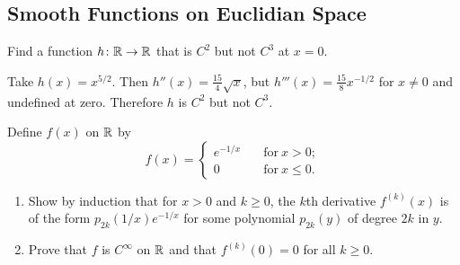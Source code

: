 \subsection{Smooth Functions on Euclidian Space}
\begin{prob}
Find a function $h \colon \mathbb{R} \to \mathbb{R}$ that is $C^2$ but not $C^3$ at $x=0$.    
\end{prob}
\begin{solution}
    Take $h(x)=x^{5/2}$. Then $h''(x)=\frac{15}{4}\sqrt{x} $, but $h'''(x)=\frac{15}{8}x^{-1/2}$ for $x\neq 0$ and undefined at zero. Therefore $h$ is $C^2$ but not $C^3$.
\end{solution}
\begin{prob}
    Define $f(x)$ on $\mathbb{R}$ by \[
        f(x)=
        \begin{cases}
            e^{-1/x} \quad & \text{for} \ x>0;\\
            0 & \text{for} \ x \leq 0.
        \end{cases}
    \] 
    \begin{enumerate}[label=(\alph*)]
        \item Show by induction that for $x>0$ and $k\geq 0$, the $k$th derivative $f^{(k)}(x)$ is of the form $p_{2k}(1/x)e^{-1/x}$ for some polynomial $p_{2k}(y)$ of degree $2k$ in $y$.
        \item Prove that $f$ is $C^{\infty}$ on $\mathbb{R}$ and that $f^{(k)}(0)=0$ for all $k\geq 0$.
    \end{enumerate}
\end{prob}
